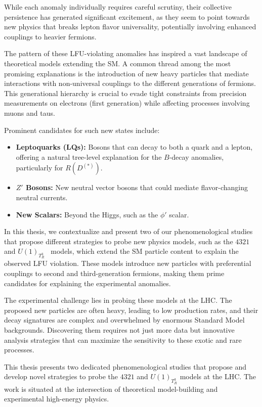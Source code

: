 While each anomaly individually requires careful scrutiny, their collective persistence has generated significant excitement, as they seem to point towards new physics that breaks lepton flavor universality, potentially involving enhanced couplings to heavier fermions.


The pattern of these LFU-violating anomalies has inspired a vast landscape of theoretical models extending the SM. A common thread among the most promising explanations is the introduction of new heavy particles that mediate interactions with non-universal couplings to the different generations of fermions. This generational hierarchy is crucial to evade tight constraints from precision measurements on electrons (first generation) while affecting processes involving muons and taus.

Prominent candidates for such new states include:
\begin{itemize}
    \item \textbf{Leptoquarks (LQs):} Bosons that can decay to both a quark and a lepton, offering a natural tree-level explanation for the $B$-decay anomalies, particularly for $R(D^{(*)})$.
    \item \textbf{$Z'$ Bosons:} New neutral vector bosons that could mediate flavor-changing neutral currents.
    \item \textbf{New Scalars:} Beyond the Higgs, such as the $\phi'$ scalar.
\end{itemize}

In this thesis, we contextualize and present two of our phenomenological studies that propose different strategies to probe new physics models, such as the $4321$~\cite{Florez2023} and $U(1)_{T^3_R}$~\cite{Qureshi:2024naw} models, which extend the SM particle content to explain the observed LFU violation. These models introduce new particles with preferential couplings to second and third-generation fermions, making them prime candidates for explaining the experimental anomalies.

The experimental challenge lies in probing these models at the LHC. The proposed new particles are often heavy, leading to low production rates, and their decay signatures are complex and overwhelmed by enormous Standard Model backgrounds. Discovering them requires not just more data but innovative analysis strategies that can maximize the sensitivity to these exotic and rare processes.

This thesis presents two dedicated phenomenological studies that propose and develop novel strategies to probe the $4321$ and $U(1)_{T^3_R}$ models at the LHC. The work is situated at the intersection of theoretical model-building and experimental high-energy physics.

